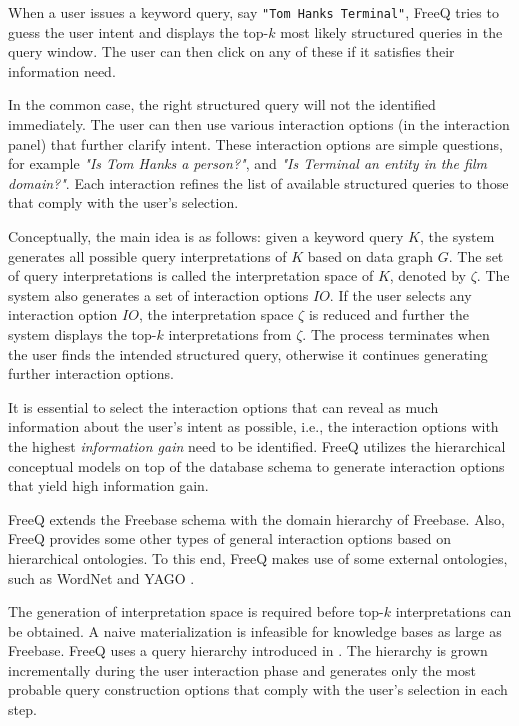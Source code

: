 \documentclass[a4paper, twoside, 12pt]{report}
\begin{document}
 When a user issues a keyword query, say \texttt{"Tom Hanks Terminal"}, FreeQ tries to guess the user intent and displays the top-$k$ most likely structured queries in the query window. The user can then click on any of these if it satisfies their information need.

 In the common case, the right structured query will not the identified immediately. The user can then use various interaction options (in the interaction panel) that further clarify intent. These interaction options are simple questions, for example \emph{"Is Tom Hanks a person?"}, and \emph{"Is Terminal an entity in the film domain?"}. Each interaction refines the list of available structured queries to those that comply with the user's selection.

 Conceptually, the main idea is as follows: given a keyword query $K$, the system generates all possible query interpretations of $K$ based on data graph $G$. The set of query interpretations is called the interpretation space of $K$, denoted by $\zeta$. The system also generates a set of interaction options $IO$. If the user selects any interaction option $IO$, the interpretation space $\zeta$ is reduced and further the system displays the top-$k$ interpretations from $\zeta$. The process terminates when the user finds the intended structured query, otherwise it continues generating further interaction options.

 It is essential to select the interaction options that can reveal as much information about the user’s intent as possible, i.e., the interaction options with the highest \emph{information gain} need to be identified. FreeQ utilizes the hierarchical conceptual models on top of the database schema to generate interaction options that yield high information gain.

 FreeQ extends the Freebase schema with the domain hierarchy of Freebase. Also, FreeQ provides some other types of general interaction options based on hierarchical ontologies. To this end, FreeQ makes use of some external ontologies, such as WordNet \cite{miller1995wordnet} and YAGO \cite{suchanek2007yago}.

 The generation of interpretation space is required before top-$k$ interpretations can be obtained. A naive materialization is infeasible for knowledge bases as large as Freebase. FreeQ  uses a query hierarchy introduced in \cite{demidova2012probabilistic}. The hierarchy is grown incrementally during the user interaction phase and generates only the most probable query construction options that comply with the user's selection in each step.
\end{document}
